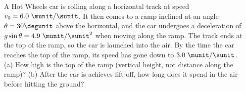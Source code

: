 A Hot Wheels car is rolling along a horizontal track at speed $v_0 = 6.0\ \munit/\sunit$.
It then comes to a ramp inclined at an angle
$\theta = 30\degunit$ above the horizontal, and the car undergoes a
deceleration of $g \sin \theta = 4.9\ \munit / \sunit^2$ when moving
along the ramp. The track ends at the top of the ramp, so the car is launched into the air.
By the time the car reaches the top of the ramp, its
speed has gone down to $3.0\ \munit / \sunit$.\\
%
(a) How high is the top of the ramp (vertical height, not distance
along the ramp)?\answercheck\hwendpart
%
(b) After the car is achieves lift-off, how long does it spend in the
air before hitting the ground?\answercheck
